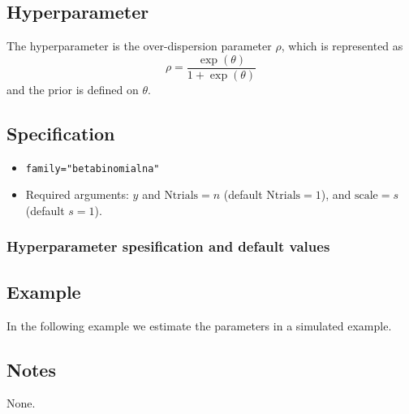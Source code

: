 \documentclass[a4paper,11pt]{article}
\begin{document}
\subsection*{Hyperparameter}

The hyperparameter is the over-dispersion parameter $\rho$, which is
represented as
\begin{displaymath}
    \rho = \frac{\exp(\theta)}{1+\exp(\theta)}
\end{displaymath}
and the prior is defined on $\theta$. 

\subsection*{Specification}

\begin{itemize}
\item \texttt{family="betabinomialna"}
\item Required arguments: $y$ and $\text{Ntrials} = n$ (default
    $\text{Ntrials}=1$), and $\text{scale} = s$ (default $s=1$).
\end{itemize}

\subsubsection*{Hyperparameter spesification and default values}


\subsection*{Example}

In the following example we estimate the parameters in a simulated
example.


\subsection*{Notes}

None.
\end{document}
